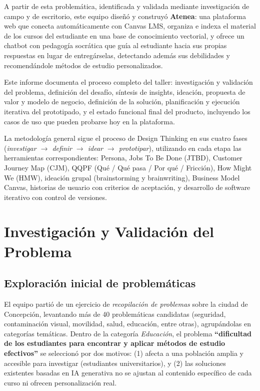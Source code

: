 \documentclass[11pt,a4paper]{article}
\begin{document}
A partir de esta problem\'atica, identificada y validada mediante investigaci\'on de campo y de escritorio, este equipo dise\~n\'o y construy\'o \textbf{Atenea}: una plataforma web que conecta autom\'aticamente con Canvas LMS, organiza e indexa el material de los cursos del estudiante en una base de conocimiento vectorial, y ofrece un chatbot con pedagog\'ia socr\'atica que gu\'ia al estudiante hacia sus propias respuestas en lugar de entreg\'arselas, detectando adem\'as sus debilidades y recomend\'andole m\'etodos de estudio personalizados.

Este informe documenta el proceso completo del taller: investigaci\'on y validaci\'on del problema, definici\'on del desaf\'io, s\'intesis de insights, ideaci\'on, propuesta de valor y modelo de negocio, definici\'on de la soluci\'on, planificaci\'on y ejecuci\'on iterativa del prototipado, y el estado funcional final del producto, incluyendo los casos de uso que pueden probarse hoy en la plataforma.

La metodolog\'ia general sigue el proceso de Design Thinking en sus cuatro fases (\emph{investigar $\rightarrow$ definir $\rightarrow$ idear $\rightarrow$ prototipar}), utilizando en cada etapa las herramientas correspondientes: Persona, Jobs To Be Done (JTBD), Customer Journey Map (CJM), QQPF (Qu\'e / Qu\'e pasa / Por qu\'e / Fricci\'on), How Might We (HMW), ideaci\'on grupal (brainstorming y brainwriting), Business Model Canvas, historias de usuario con criterios de aceptaci\'on, y desarrollo de software iterativo con control de versiones.

\section{Investigaci\'on y Validaci\'on del Problema}

\subsection{Exploraci\'on inicial de problem\'aticas}

El equipo parti\'o de un ejercicio de \emph{recopilaci\'on de problemas} sobre la ciudad de Concepci\'on, levantando m\'as de 40 problem\'aticas candidatas (seguridad, contaminaci\'on visual, movilidad, salud, educaci\'on, entre otras), agrup\'andolas en categor\'ias tem\'aticas. Dentro de la categor\'ia \emph{Educaci\'on}, el problema \textbf{``dificultad de los estudiantes para encontrar y aplicar m\'etodos de estudio efectivos''} se seleccion\'o por dos motivos: (1) afecta a una poblaci\'on amplia y accesible para investigar (estudiantes universitarios), y (2) las soluciones existentes basadas en IA generativa no se ajustan al contenido espec\'ifico de cada curso ni ofrecen personalizaci\'on real.
\end{document}
